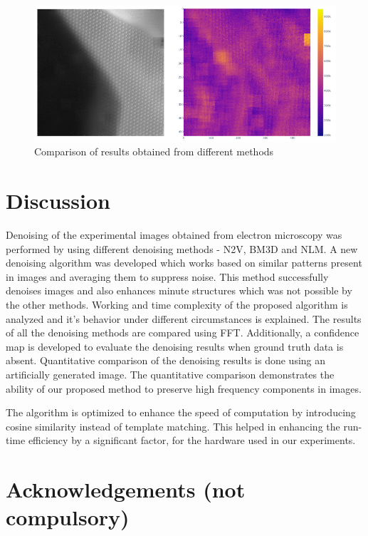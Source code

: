 \documentclass[fleqn,10pt]{wlscirep}
\begin{document}
	\begin{figure}[H]
		\centering
		\includegraphics[scale=0.7]{./imgs/confidence_map.png}
		\caption{Comparison of results obtained from different methods}
		\label{fig:confidence_map}
	\end{figure}
	
	\section*{Discussion}
	
	Denoising of the experimental images obtained from electron microscopy was performed by using different denoising methods - N2V, BM3D and NLM. A new denoising algorithm was developed which works based on similar patterns present in images and averaging them to suppress noise. This method successfully denoises images and also enhances minute structures which was not possible by the other methods. Working and time complexity of the proposed algorithm is analyzed and it's behavior under different circumstances is explained. The results of all the denoising methods are compared using FFT. Additionally, a confidence map is developed to evaluate the denoising results when ground truth data is absent. Quantitative comparison of the denoising results is done using an artificially generated image. The quantitative comparison demonstrates the ability of our proposed method to preserve high frequency components in images.  
	
	The algorithm is optimized to enhance the speed of computation by introducing cosine similarity instead of template matching. This helped in enhancing the run-time efficiency by a significant factor, for the hardware used in our experiments.
	
	

	\section*{Acknowledgements (not compulsory)}
	
\end{document}
